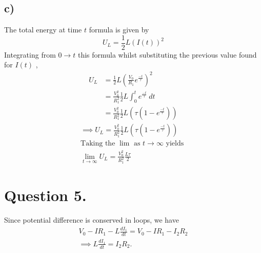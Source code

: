 \documentclass[
	12pt,
	]{article}
\theoremstyle{definition}
\theoremstyle{definition}
\theoremstyle{definition}
\theoremstyle{definition}
\theoremstyle{definition}
\theoremstyle{example}
\theoremstyle{note}
\theoremstyle{remark}
\theoremstyle{example}
\begin{document}
		\subsection*{c) }
				The total energy at time $t$ formula is given by
						$$ U_{L} = \frac12 L (I(t))^{2}$$
						Integrating from $0 \to t$ this formula whilst substituting the previous value found for $I(t)$ , 
						\begin{align*}
							U_{L} &= \frac12 L \left(\frac{V_{0}}{R_{1}}e^{\frac{-t}{\tau}}\right)^{2}\\
							&= \frac{V_{0}^{2}}{R_{1}^{2}} \frac12 L \int_{0}^{t} e^{\frac{-t}{\tau}}\ dt \\ 
							&= \frac{V_{0}^{2}}{R_{1}^{2}} \frac12 L(\tau\left(1-e^{\frac{-t}{\tau}}\right)) 
						\end{align*}
						\begin{gather*}
						\implies U_{L} = \frac{V_{0}^{2}}{R_{1}^{2}} \frac12 L(\tau\left(1-e^{\frac{-t}{\tau}}\right))\\
								\text{Taking the $\lim$ as $t\to \infty$ yields } \\
								\lim_{t\to \infty} U_{L}  = \frac{V_{0}^{2}}{R_{1}^{2}} \frac{L\tau}{2}
						\end{gather*}
	\section*{Question 5.}
		Since potential difference is conserved in loops, we have 
		\begin{gather*}
			V_{0} - IR_{1} - L \frac{dI_{1}}{dt} = V_{0} - IR_{1} - I_{2}R_{2} \\
			\implies L\frac{dI_{1}}{dt} = I_{2}R_{2}.
		\end{gather*}
		 
\end{document}
